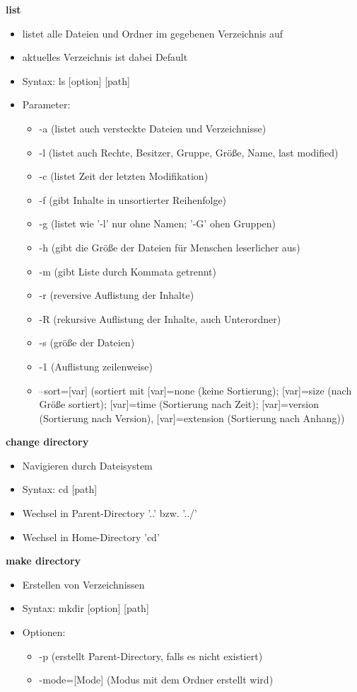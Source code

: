 \documentclass[12pt,utf8, 10pt]{article}
\begin{document}
\textbf{list}
\begin{itemize}
	\item listet alle Dateien und Ordner im gegebenen Verzeichnis auf
	\item aktuelles Verzeichnis ist dabei Default
	\item Syntax: ls [option] [path]
	\item Parameter:
	\begin{itemize}
		\item -a (listet auch versteckte Dateien und Verzeichnisse)
		\item -l (listet auch Rechte, Besitzer, Gruppe, Größe, Name, last modified)
		\item -c (listet Zeit der letzten Modifikation)
		\item -f (gibt Inhalte in unsortierter Reihenfolge)
		\item -g (listet wie '-l' nur ohne Namen; '-G' ohen Gruppen)
		\item -h (gibt die Größe der Dateien für Menschen leserlicher aus)
		\item -m (gibt Liste durch Kommata getrennt)
		\item -r (reversive Auflistung der Inhalte)
		\item -R (rekursive Auflistung der Inhalte, auch Unterordner)
		\item -s (größe der Dateien)
		\item -1 (Auflistung zeilenweise)
		\item --sort=[var] (sortiert mit [var]=none (keine Sortierung); [var]=size (nach Größe sortiert); [var]=time (Sortierung nach Zeit); [var]=version (Sortierung nach Version), [var]=extension (Sortierung nach Anhang))
	\end{itemize}
\end{itemize}

\textbf{change directory}
\begin{itemize}
	\item Navigieren durch Dateisystem
	\item Syntax: cd [path]
	\item Wechsel in Parent-Directory '..' bzw. '../'
	\item Wechsel in Home-Directory 'cd' 
\end{itemize}

\textbf{make directory}
\begin{itemize}
	\item Erstellen von Verzeichnissen
	\item Syntax: mkdir [option] [path]
	\item Optionen:
	\begin{itemize}
		\item -p (erstellt Parent-Directory, falls es nicht existiert)
		\item -mode=[Mode] (Modus mit dem Ordner erstellt wird)
	\end{itemize}
\end{itemize}
\end{document}
